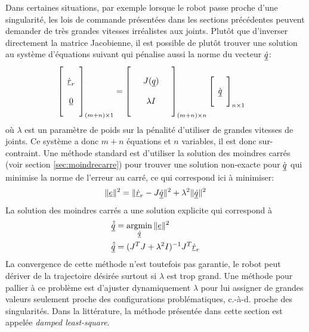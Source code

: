 Dans certaines situations, par exemple lorsque le robot passe proche d'une singularité, les lois de commande présentées dans les sections précédentes peuvent demander de très grandes vitesses irréalistes aux joints. Plutôt que d'inverser directement la matrice Jacobienne, il est possible de plutôt trouver une solution au système d'équations suivant qui pénalise aussi la norme du vecteur $\underline{\dot{q}}$:
\begin{align}
	\left[ \begin{array}{c}  \\ \dot{\underline{r}}_r \\ \\ \underline{0} \\ \\
	\end{array} \right]_{(m+n) \times 1}
	&=
	\left[ \begin{array}{c c c}
			   &&\\
			   & J(\underline{q}) &\\
			   &&\\
			   &\lambda I &\\
			   &&
	\end{array} \right]_{(m + n)  \times n}
	\left[ \begin{array}{c}
			   \\ \dot{\underline{q}} \\ \\
	\end{array} \right]_{n \times 1}
\end{align}
où $\lambda$ est un paramètre de poids sur la pénalité d'utiliser de grandes vitesses de joints. Ce système a donc $m+n$ équations et $n$ variables, il est donc sur-contraint. Une méthode standard est d'utiliser la solution des moindres carrés (voir section \ref{sec:moindrecarre}) pour trouver une solution non-exacte pour $\dot{\underline{q}}$ qui minimise la norme de l'erreur au carré, ce qui correspond ici à minimiser:
\begin{align}
	\| \underline{e} \|^2 = \| \underline{\dot{r}}_r - J \underline{\dot{q}}   \|^2 + \lambda^2 \| \underline{\dot{q}} \|^2
\end{align}
La solution des moindres carrés a une solution explicite qui correspond à
\begin{align}
	\col{\hat{\dot{q}}} &= \operatornamewithlimits{argmin}\limits_{\col{\dot{q}}} \| \col{e} \|^2 \\
	\col{\hat{\dot{q}}} &= \huge( J^T J + \lambda^2 I \huge)^{-1} J^T  \col{\dot{r}}_r
\end{align}
La convergence de cette méthode n'est toutefois pas garantie, le robot peut dériver de la trajectoire désirée surtout si $\lambda$ est trop grand. Une méthode pour pallier à ce problème est d'ajuster dynamiquement $\lambda$ pour lui assigner de grandes valeurs seulement proche des configurations problématiques, c.-à-d. proche des singularités. Dans la littérature, la méthode présentée dans cette section est appelée \textit{damped least-square}.


